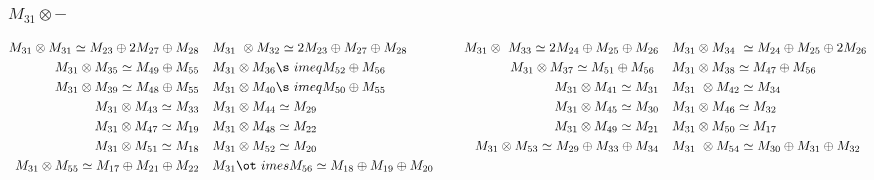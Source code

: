 \subsubsection{$M_31\otimes -$}
\begin{align*}
M_{31} \otimes M_{31} \simeq M_{23} \oplus 2 M_{27} \oplus M_{28} &&& M_{31} \
\otimes M_{32} \simeq 2 M_{23} \oplus M_{27} \oplus M_{28} &&& M_{31} \otimes \
M_{33} \simeq 2 M_{24} \oplus M_{25} \oplus M_{26} &&& M_{31} \otimes M_{34} \
\simeq M_{24} \oplus M_{25} \oplus 2 M_{26}\\
M_{31} \otimes M_{35} \simeq M_{49} \oplus M_{55} &&& M_{31} \otimes M_{36} \s\
imeq M_{52} \oplus M_{56} &&& M_{31} \otimes M_{37} \simeq M_{51} \oplus M_{56\
} &&& M_{31} \otimes M_{38} \simeq M_{47} \oplus M_{56}\\
M_{31} \otimes M_{39} \simeq M_{48} \oplus M_{55} &&& M_{31} \otimes M_{40} \s\
imeq M_{50} \oplus M_{55} &&& M_{31} \otimes M_{41} \simeq M_{31} &&& M_{31} \
\otimes M_{42} \simeq M_{34}\\
M_{31} \otimes M_{43} \simeq M_{33} &&& M_{31} \otimes M_{44} \simeq M_{29} &&\
& M_{31} \otimes M_{45} \simeq M_{30} &&& M_{31} \otimes M_{46} \simeq M_{32}\
\\
M_{31} \otimes M_{47} \simeq M_{19} &&& M_{31} \otimes M_{48} \simeq M_{22} &&\
& M_{31} \otimes M_{49} \simeq M_{21} &&& M_{31} \otimes M_{50} \simeq M_{17}\
\\
M_{31} \otimes M_{51} \simeq M_{18} &&& M_{31} \otimes M_{52} \simeq M_{20} &&\
& M_{31} \otimes M_{53} \simeq M_{29} \oplus M_{33} \oplus M_{34} &&& M_{31} \
\otimes M_{54} \simeq M_{30} \oplus M_{31} \oplus M_{32}\\
M_{31} \otimes M_{55} \simeq M_{17} \oplus M_{21} \oplus M_{22} &&& M_{31} \ot\
imes M_{56} \simeq M_{18} \oplus M_{19} \oplus M_{20}\\
\end{align*}

